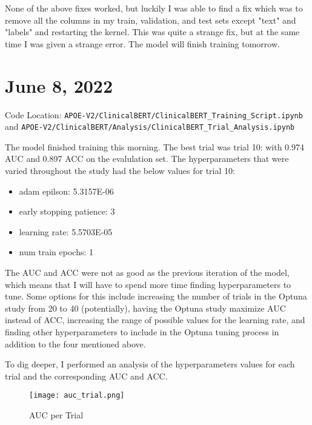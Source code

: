 \documentclass[11pt,letterpaper]{article}
\begin{document}
None of the above fixes worked, but luckily I was able to find a fix which was to remove all the columns in my train, validation, and test sets except "text" and "labels" and restarting the kernel. This was quite a strange fix, but at the same time I was given a strange error. The model will finish training tomorrow. 

\section{June 8, 2022}

Code Location: \texttt{APOE-V2/ClinicalBERT/ClinicalBERT\_Training\_Script.ipynb} \\ and \texttt{APOE-V2/ClinicalBERT/Analysis/ClinicalBERT\_Trial\_Analysis.ipynb}

The model finished training this morning. The best trial was trial 10: with 0.974 AUC and 0.897 ACC on the evalulation set. The hyperparameters that were varied throughout the study had the below values for trial 10:

\begin{itemize}
   \item adam epilson: 5.3157E-06
   \item early stopping patience: 3
   \item learning rate: 5.5703E-05
   \item num train epochs: 1
\end{itemize}

The AUC and ACC were not as good as the previous iteration of the model, which means that I will have to spend more time finding hyperparameters to tune. Some options for this include increasing the number of trials in the Optuna study from 20 to 40 (potentially), having the Optuna study maximize AUC instead of ACC, increasing the range of possible values for the learning rate, and finding other hyperparameters to include in the Optuna tuning process in addition to the four mentioned above. 

To dig deeper, I performed an analysis of the hyperparameters values for each trial and the corresponding AUC and ACC. 

\begin{figure}[ht!]
\centering
\texttt{[image: auc\_trial.png]}
\caption{AUC per Trial}
\end{figure}
\end{document}
